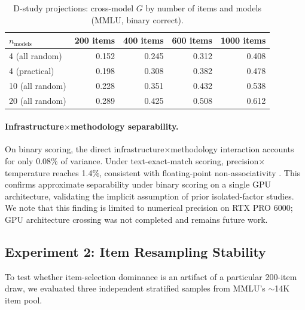 \documentclass[11pt,letterpaper]{article}
\begin{document}
\begin{table}[t]
\centering
\caption{D-study projections: cross-model $G$ by number of items and models (MMLU, binary correct).}
\label{tab:dstudy_cross}
\small
\begin{tabular}{@{}lrrrr@{}}
\toprule
$n_\text{models}$ & 200 items & 400 items & 600 items & 1000 items \\
\midrule
4 (all random) & 0.152 & 0.245 & 0.312 & 0.408 \\
4 (practical) & 0.198 & 0.308 & 0.382 & 0.478 \\
10 (all random) & 0.228 & 0.351 & 0.432 & 0.538 \\
20 (all random) & 0.289 & 0.425 & 0.508 & 0.612 \\
\bottomrule
\end{tabular}
\end{table}

\paragraph{Infrastructure$\times$methodology separability.}
On binary scoring, the direct infrastructure$\times$methodology interaction accounts for only 0.08\% of variance.
Under text-exact-match scoring, precision$\times$temperature reaches 1.4\%, consistent with floating-point non-associativity \citep{messina2026numerical}.
This confirms approximate separability under binary scoring on a single GPU architecture, validating the implicit assumption of prior isolated-factor studies.
We note that this finding is limited to numerical precision on RTX PRO 6000; GPU architecture crossing was not completed and remains future work.

\subsection{Experiment 2: Item Resampling Stability}

To test whether item-selection dominance is an artifact of a particular 200-item draw, we evaluated three independent stratified samples from MMLU's $\sim$14K item pool.
\end{document}
